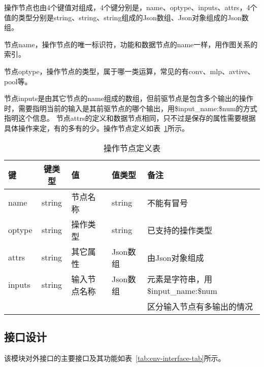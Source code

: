 操作节点也由4个键值对组成，4个键分别是，name、optype、inputs、attrs，4个值的类型分别是string、string、string组成的Json数组、Json对象组成的Json数组。

节点name，操作节点的唯一标识符，功能和数据节点的name一样，用作图关系的索引。

节点optype，操作节点的类型，属于哪一类运算，常见的有conv、mlp、avtive、pool等。

节点inputs是由其它节点的name组成的数组，但前驱节点是包含多个输出的操作时，需要指明当前的输入是其前驱节点的哪个输出，用\$input\_name:\$num的方式指明这个信息。
节点attrs的定义和数据节点相同，只不过是保存的属性需要根据具体操作来定，有的多有的少。操作节点定义如表~\ref{tab:op-struct-tab}所示。

\begin{table}[htb]
  \centering\footnotesize
  \caption{操作节点定义表}
  \label{tab:op-struct-tab}
  \begin{tabular}{lclll}
    \toprule
    键        & 键类型    & 值    & 值类型     &备注       \\
    \midrule
    name   & string  & 节点名称 &string  & 不能有冒号\\
    optype & string  & 操作类型 &string & 已支持的操作类型 \\
    attrs  & string  & 其它属性 & Json数组 & 由Json对象组成 \\
    inputs & string  & 输入节点名称 & Json数组 & 元素是字符串，用\$input\_name:\$num \\
                                          &&&&区分输入节点有多输出的情况 \\
    
    \bottomrule
  \end{tabular}
\end{table}

\subsection {接口设计}
该模块对外接口的主要接口及其功能如表~\ref{tab:env-interface-tab}所示。

